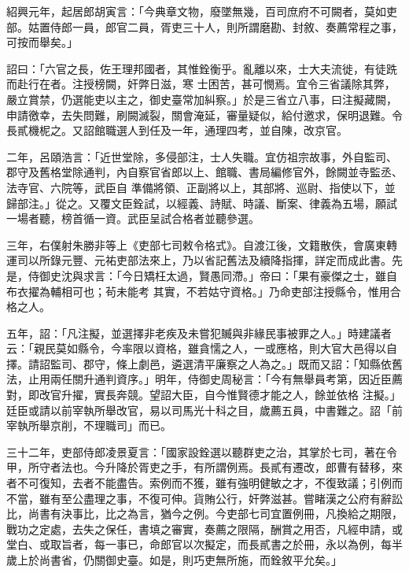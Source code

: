 \begin{pinyinscope}
 紹興元年，起居郎胡寅言：「今典章文物，廢墜無幾，百司庶府不可闕者，莫如吏部。姑置侍郎一員，郎官二員，胥吏三十人，則所謂磨勘、封敘、奏薦常程之事，可按而舉矣。」



 詔曰：「六官之長，佐王理邦國者，其惟銓衡乎。亂離以來，士大夫流徙，有徒跣而赴行在者。注授榜闕，奸弊日滋，寒
 士困苦，甚可憫焉。宜令三省議除其弊，嚴立賞禁，仍選能吏以主之，御史臺常加糾察。」於是三省立八事，曰注擬藏闕，申請徼幸，去失問難，刷闕滅裂，關會淹延，審量疑似，給付邀求，保明退難。令長貳機柅之。又詔館職選人到任及一年，通理四考，並自陳，改京官。



 二年，呂頤浩言：「近世堂除，多侵部注，士人失職。宜仿祖宗故事，外自監司、郡守及舊格堂除通判，內自察官省郎以上、館職、書局編修官外，餘闕並寺監丞、法寺官、六院等，武臣自
 準備將領、正副將以上，其部將、巡尉、指使以下，並歸部注。」從之。又覆文臣銓試，以經義、詩賦、時議、斷案、律義為五場，願試一場者聽，榜首循一資。武臣呈試合格者並聽參選。



 三年，右僕射朱勝非等上《吏部七司敕令格式》。自渡江後，文籍散佚，會廣東轉運司以所錄元豐、元祐吏部法來上，乃以省記舊法及續降指揮，詳定而成此書。先是，侍御史沈與求言：「今日矯枉太過，賢愚同滯。」帝曰：「果有豪傑之士，雖自布衣擢為輔相可也；茍未能考
 其實，不若姑守資格。」乃命吏部注授縣令，惟用合格之人。



 五年，詔：「凡注擬，並選擇非老疾及未嘗犯贓與非緣民事被罪之人。」時建議者云：「親民莫如縣令，今率限以資格，雖貪懦之人，一或應格，則大官大邑得以自擇。請詔監司、郡守，條上劇邑，遴選清平廉察之人為之。」既而又詔：「知縣依舊法，止用兩任關升通判資序。」明年，侍御史周秘言：「今有無舉員考第，因近臣薦對，即改官升擢，實長奔競。望詔大臣，自今惟賢德才能之人，餘並依格
 注擬。」廷臣或請以前宰執所舉改官，易以司馬光十科之目，歲薦五員，中書難之。詔「前宰執所舉京削，不理職司」而已。



 三十二年，吏部侍郎凌景夏言：「國家設銓選以聽群吏之治，其掌於七司，著在令甲，所守者法也。今升降於胥吏之手，有所謂例焉。長貳有遷改，郎曹有替移，來者不可復知，去者不能盡告。索例而不獲，雖有強明健敏之才，不復致議；引例而不當，雖有至公盡理之事，不復可伸。貨賄公行，奸弊滋甚。嘗睹漢之公府有辭訟
 比，尚書有決事比，比之為言，猶今之例。今吏部七司宜置例冊，凡換給之期限，戰功之定處，去失之保任，書填之審實，奏薦之限隔，酬賞之用否，凡經申請，或堂白、或取旨者，每一事已，命郎官以次擬定，而長貳書之於冊，永以為例，每半歲上於尚書省，仍關御史臺。如是，則巧吏無所施，而銓敘平允矣。」




\end{pinyinscope}
